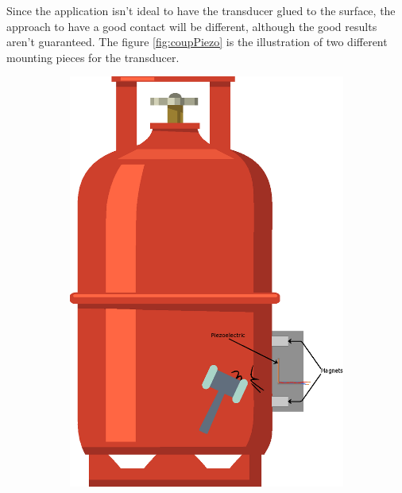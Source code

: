 Since the application isn't ideal to have the transducer glued to the surface, the approach to have a good contact will be different, although the good results aren't guaranteed. The figure \ref{fig:coupPiezo} is the illustration of two different mounting pieces for the transducer.
\begin{figure}[]
    \centering
    \begin{subfigure}{0.3\textwidth}
        \centering
        \includegraphics[width=\linewidth]{Chapters/4CHP/Figures/PiezoMagnetsSlot.eps}
        \caption{}{}
        \label{subfig:piezoslot}
    \end{subfigure}
    \begin{subfigure}{0.3\textwidth}
        \centering

\end{subfigure}
\end{figure}
